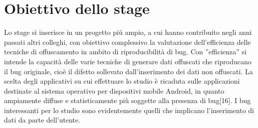\clearpage
\section*{Obiettivo dello stage}

Lo stage si inserisce in un progetto più ampio, a cui hanno contribuito negli anni passati altri colleghi, con obiettivo complessivo la valutazione dell'efficienza delle tecniche di offuscamento in ambito di riproducibilità di bug. Con ''efficienza'' si intende la capacità delle varie tecniche di generare dati offuscati che riproducano il bug originale, cioè il difetto sollevato dall'inserimento dei dati non offuscati.  La scelta degli applicativi su cui effettuare lo studio è ricaduta sulle applicazioni destinate al sistema operativo per dispositivi mobile Android, in quanto ampiamente diffuse e statisticamente più soggette alla presenza di bug[16]. I bug interessanti per lo studio sono evidentemente quelli che implicano l'inserimento di dati da parte dell'utente.

